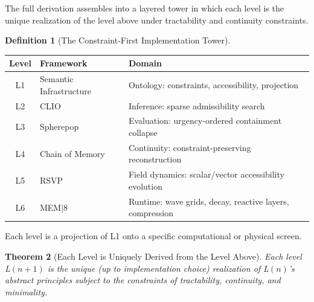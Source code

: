 \documentclass[12pt, a4paper, twoside]{article}
\theoremstyle{plain}
\newtheorem{theorem}{Theorem}[section]
\theoremstyle{definition}
\newtheorem{definition}[theorem]{Definition}
\theoremstyle{remark}
\begin{document}
The full derivation assembles into a layered tower in which each level is the
unique realization of the level above under tractability and continuity
constraints.

\begin{definition}[The Constraint-First Implementation Tower]
\label{def:impl_tower}
\begin{center}
\renewcommand{\arraystretch}{1.5}
\begin{tabular}{@{}cll@{}}
\toprule
\textbf{Level} & \textbf{Framework} & \textbf{Domain} \\
\midrule
L1 & Semantic Infrastructure & Ontology: constraints, accessibility, projection \\
L2 & CLIO           & Inference: sparse admissibility search \\
L3 & Spherepop      & Evaluation: urgency-ordered containment collapse \\
L4 & Chain of Memory & Continuity: constraint-preserving reconstruction \\
L5 & RSVP           & Field dynamics: scalar/vector accessibility evolution \\
L6 & MEM$|$8        & Runtime: wave grids, decay, reactive layers, compression \\
\bottomrule
\end{tabular}
\end{center}
Each level is a projection of L1 onto a specific computational or physical screen.
\end{definition}

\begin{theorem}[Each Level is Uniquely Derived from the Level Above]
\label{thm:tower_derivability}
Each level L$(n+1)$ is the unique (up to implementation choice) realization of
L$(n)$'s abstract principles subject to the constraints of tractability,
continuity, and minimality.
\end{theorem}
\end{document}
